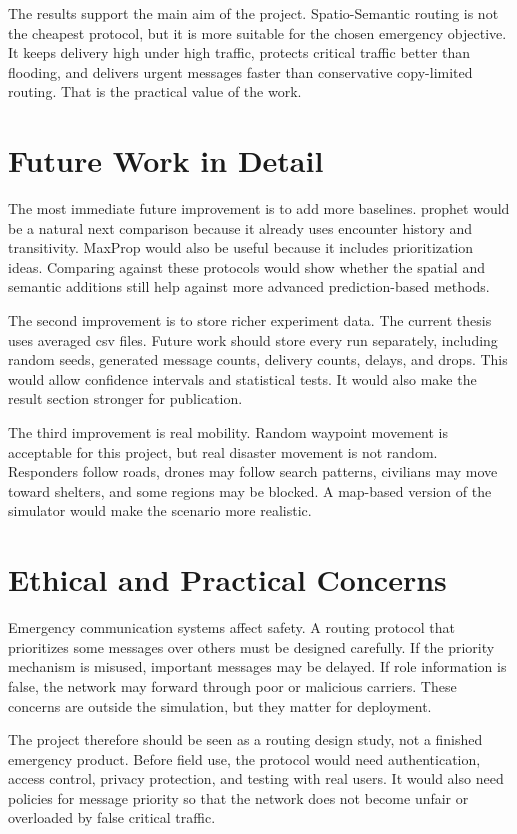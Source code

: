 The results support the main aim of the project. Spatio-Semantic routing is not the cheapest protocol, but it is more suitable for the chosen emergency objective. It keeps delivery high under high traffic, protects critical traffic better than flooding, and delivers urgent messages faster than conservative copy-limited routing. That is the practical value of the work.

\section{Future Work in Detail}
The most immediate future improvement is to add more baselines. \ac{prophet} would be a natural next comparison because it already uses encounter history and transitivity. MaxProp would also be useful because it includes prioritization ideas. Comparing against these protocols would show whether the spatial and semantic additions still help against more advanced prediction-based methods.

The second improvement is to store richer experiment data. The current thesis uses averaged \ac{csv} files. Future work should store every run separately, including random seeds, generated message counts, delivery counts, delays, and drops. This would allow confidence intervals and statistical tests. It would also make the result section stronger for publication.

The third improvement is real mobility. Random waypoint movement is acceptable for this project, but real disaster movement is not random. Responders follow roads, drones may follow search patterns, civilians may move toward shelters, and some regions may be blocked. A map-based version of the simulator would make the scenario more realistic.

\section{Ethical and Practical Concerns}
Emergency communication systems affect safety. A routing protocol that prioritizes some messages over others must be designed carefully. If the priority mechanism is misused, important messages may be delayed. If role information is false, the network may forward through poor or malicious carriers. These concerns are outside the simulation, but they matter for deployment.

The project therefore should be seen as a routing design study, not a finished emergency product. Before field use, the protocol would need authentication, access control, privacy protection, and testing with real users. It would also need policies for message priority so that the network does not become unfair or overloaded by false critical traffic.

